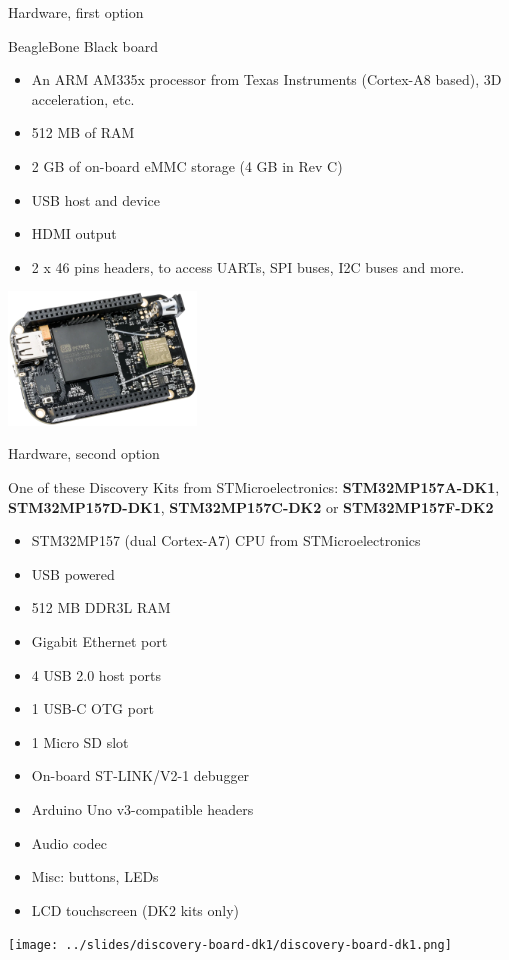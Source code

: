 \documentclass[a4paper,12pt,obeyspaces,spaces,hyphens]{article}
\begin{document}
\feshowtitle

\feshowinfo

\feagendatwocolumn
{Hardware, first option}
{
  BeagleBone Black board
  \begin{itemize}
  \item An ARM AM335x processor from Texas Instruments (Cortex-A8
    based), 3D acceleration, etc.
  \item 512 MB of RAM
  \item 2 GB of on-board eMMC storage
        \newline(4 GB in Rev C)
  \item USB host and device
  \item HDMI output
  \item 2 x 46 pins headers, to access UARTs, SPI buses, I2C buses
    and more.
  \end{itemize}

}{}
{
  \begin{center}
    \includegraphics[width=5cm]{../slides/beagleboneblack-board/beagleboneblack.png}
  \end{center}
}

\feagendatwocolumn
{Hardware, second option}
{
  One of these Discovery Kits from STMicroelectronics: {\bf
  STM32MP157A-DK1}, {\bf STM32MP157D-DK1}, {\bf STM32MP157C-DK2} or
  {\bf STM32MP157F-DK2}
  \begin{itemize}
  \item STM32MP157 (dual Cortex-A7) CPU from STMicroelectronics
  \item USB powered
  \item 512 MB DDR3L RAM
  \item Gigabit Ethernet port
  \item 4 USB 2.0 host ports
  \item 1 USB-C OTG port
  \item 1 Micro SD slot
  \item On-board ST-LINK/V2-1 debugger
  \item Arduino Uno v3-compatible headers
  \item Audio codec
  \item Misc: buttons, LEDs
  \item LCD touchscreen (DK2 kits only)
  \end{itemize}
}{}
{
  \begin{center}
    \texttt{[image: ../slides/discovery-board-dk1/discovery-board-dk1.png]}
  \end{center}
}
\end{document}
